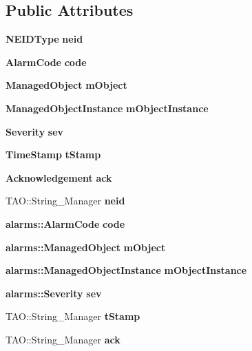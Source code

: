 \subsection*{Public Attributes}
\begin{DoxyCompactItemize}
\item 
{\bf N\+E\+I\+D\+Type} {\bfseries neid}\label{structalarms_1_1AlarmNotification_a626e7fd9ef060dfbf2a499e87e3019e3}

\item 
{\bf Alarm\+Code} {\bfseries code}\label{structalarms_1_1AlarmNotification_a243d43aec7fef91390ca37056851852d}

\item 
{\bf Managed\+Object} {\bfseries m\+Object}\label{structalarms_1_1AlarmNotification_a109eeaa6d917eae72d1e3fff62af0c87}

\item 
{\bf Managed\+Object\+Instance} {\bfseries m\+Object\+Instance}\label{structalarms_1_1AlarmNotification_a6fa06d06a50c86ae6588cc2403490fb3}

\item 
{\bf Severity} {\bfseries sev}\label{structalarms_1_1AlarmNotification_a1bca6e90254e301fae898d85208b480b}

\item 
{\bf Time\+Stamp} {\bfseries t\+Stamp}\label{structalarms_1_1AlarmNotification_ab61c426f3c126de9eeee07aeac876aca}

\item 
{\bf Acknowledgement} {\bfseries ack}\label{structalarms_1_1AlarmNotification_ac1f97aa794111cae229c24d71acdd8bf}

\item 
T\+A\+O\+::\+String\+\_\+\+Manager {\bfseries neid}\label{structalarms_1_1AlarmNotification_a59f9b4cfd067eabd88ddb050cc7c9b80}

\item 
{\bf alarms\+::\+Alarm\+Code} {\bfseries code}\label{structalarms_1_1AlarmNotification_aaf6cae7211edcb962b27b4205fa8c7ee}

\item 
{\bf alarms\+::\+Managed\+Object} {\bfseries m\+Object}\label{structalarms_1_1AlarmNotification_a3a12de1930d5dc935187c73d885a99b5}

\item 
{\bf alarms\+::\+Managed\+Object\+Instance} {\bfseries m\+Object\+Instance}\label{structalarms_1_1AlarmNotification_af2c166e2eb89e5ec5a51cc990d5d32c1}

\item 
{\bf alarms\+::\+Severity} {\bfseries sev}\label{structalarms_1_1AlarmNotification_a02f95b58ee002a8818032fb73991dcd1}

\item 
T\+A\+O\+::\+String\+\_\+\+Manager {\bfseries t\+Stamp}\label{structalarms_1_1AlarmNotification_adb339d88f0662518f293aebe48ddd125}

\item 
T\+A\+O\+::\+String\+\_\+\+Manager {\bfseries ack}\label{structalarms_1_1AlarmNotification_a8c5410a786dac7c5a6219ac488fc878b}

\end{DoxyCompactItemize}


